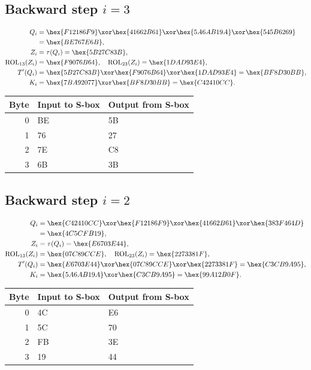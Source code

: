 \subsection*{Backward step $i=3$}
\begin{align*}
Q_i&=\hex{F12186F9}\xor\hex{41662B61}\xor\hex{5A6AB19A}\xor\hex{545B6269}\\&=\hex{BE767E6B},\\
Z_i&=\tau(Q_i)=\hex{5B27C83B},\\
\operatorname{ROL}_{13}(Z_i)&=\hex{F9076B64},\quad\operatorname{ROL}_{23}(Z_i)=\hex{1DAD93E4},\\
T'(Q_i)&=\hex{5B27C83B}\xor\hex{F9076B64}\xor\hex{1DAD93E4}=\hex{BF8D30BB},\\
K_i&=\hex{7BA92077}\xor\hex{BF8D30BB}=\hex{C42410CC}.\end{align*}
\begingroup\small
\begin{longtable}{rll}
\toprule
Byte & Input to S-box & Output from S-box\\\midrule
\endhead
0 & BE & 5B\\
1 & 76 & 27\\
2 & 7E & C8\\
3 & 6B & 3B\\
\bottomrule\end{longtable}
\endgroup
\subsection*{Backward step $i=2$}
\begin{align*}
Q_i&=\hex{C42410CC}\xor\hex{F12186F9}\xor\hex{41662B61}\xor\hex{383F464D}\\&=\hex{4C5CFB19},\\
Z_i&=\tau(Q_i)=\hex{E6703E44},\\
\operatorname{ROL}_{13}(Z_i)&=\hex{07C89CCE},\quad\operatorname{ROL}_{23}(Z_i)=\hex{2273381F},\\
T'(Q_i)&=\hex{E6703E44}\xor\hex{07C89CCE}\xor\hex{2273381F}=\hex{C3CB9A95},\\
K_i&=\hex{5A6AB19A}\xor\hex{C3CB9A95}=\hex{99A12B0F}.\end{align*}
\begingroup\small
\begin{longtable}{rll}
\toprule
Byte & Input to S-box & Output from S-box\\\midrule
\endhead
0 & 4C & E6\\
1 & 5C & 70\\
2 & FB & 3E\\
3 & 19 & 44\\
\bottomrule\end{longtable}
\endgroup
